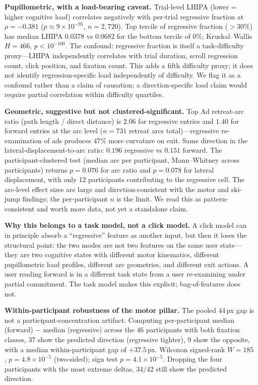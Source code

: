 \documentclass[10pt,twocolumn,letterpaper]{article}
\begin{document}
\textbf{Pupillometric, with a load-bearing caveat.} Trial-level LHIPA (lower = higher cognitive load) correlates negatively with per-trial regressive fraction at $\rho = -0.381$ ($p \approx 9 \times 10^{-95}$, $n = 2{,}720$). Top tercile of regressive fraction ($>30\%$) has median LHIPA $0.0378$ vs $0.0682$ for the bottom tercile of $0\%$; Kruskal--Wallis $H = 466$, $p < 10^{-100}$. The confound: regressive fraction is itself a task-difficulty proxy---LHIPA independently correlates with trial duration, scroll regression count, click position, and fixation count. This adds a fifth difficulty proxy; it does not identify regression-specific load independently of difficulty. We flag it as a confound rather than a claim of causation; a direction-specific load claim would require partial correlation within difficulty quartiles.

\textbf{Geometric, suggestive but not clustered-significant.} Top Ad retreat-arc ratio (path length / direct distance) is $2.06$ for regressive entries and $1.40$ for forward entries at the arc level ($n = 731$ retreat arcs total)---regressive re-examination of ads produces 47\% more curvature on exit. Same direction in the lateral-displacement-to-arc ratio: $0.196$ regressive vs $0.151$ forward. The participant-clustered test (median arc per participant, Mann--Whitney across participants) returns $p = 0.076$ for arc ratio and $p = 0.078$ for lateral displacement, with only 12 participants contributing to the regressive cell. The arc-level effect sizes are large and direction-consistent with the motor and ski-jump findings; the per-participant $n$ is the limit. We read this as pattern-consistent and worth more data, not yet a standalone claim.

\textbf{Why this belongs to a task model, not a click model.} A click model can in principle absorb a ``regressive'' feature as another input, but then it loses the structural point: the two modes are not two features on the same user state---they are two cognitive states with different motor kinematics, different pupillometric load profiles, different arc geometries, and different exit actions. A user reading forward is in a different task state from a user re-examining under partial commitment. The task model makes this explicit; bag-of-features does not.

\textbf{Within-participant robustness of the motor pillar.} The pooled 44\,px gap is not a participant-concentration artifact. Computing per-participant median (forward) $-$ median (regressive) across the 46 participants with both fixation classes, $37$ show the predicted direction (regressive tighter), $9$ show the opposite, with a median within-participant gap of $+37.5$\,px. Wilcoxon signed-rank $W = 185$, $p = 4.8 \times 10^{-5}$ (two-sided); sign test $p = 4.1 \times 10^{-5}$. Dropping the four participants with the most extreme deltas, $34/42$ still show the predicted direction.
\end{document}
